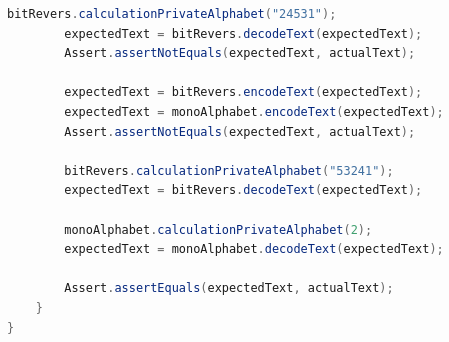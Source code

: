 \documentclass[a4paper,12pt]{article}
\begin{document}
\begin{lstlisting}[language=java, caption=код модуля IntegrationCipherTest.java]
        bitRevers.calculationPrivateAlphabet("24531");
        expectedText = bitRevers.decodeText(expectedText);
        Assert.assertNotEquals(expectedText, actualText);

        expectedText = bitRevers.encodeText(expectedText);
        expectedText = monoAlphabet.encodeText(expectedText);
        Assert.assertNotEquals(expectedText, actualText);

        bitRevers.calculationPrivateAlphabet("53241");
        expectedText = bitRevers.decodeText(expectedText);

        monoAlphabet.calculationPrivateAlphabet(2);
        expectedText = monoAlphabet.decodeText(expectedText);

        Assert.assertEquals(expectedText, actualText);
    }
}
\end{lstlisting}
\end{document}
